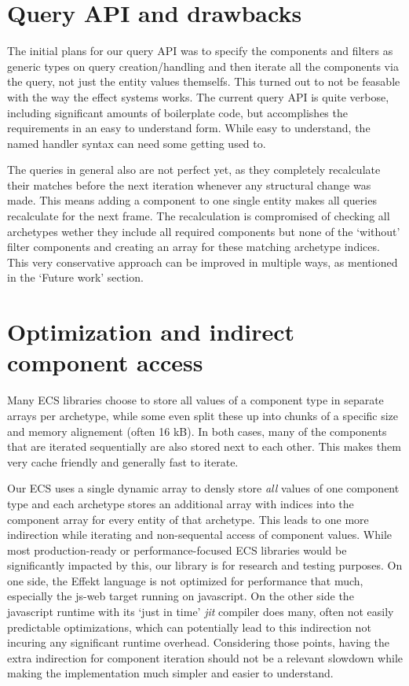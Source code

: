 \section{Query API and drawbacks}

The initial plans for our query API was to specify the components and filters as generic types on query creation/handling and then iterate all the components via the query, not just the entity values themselfs. This turned out to not be feasable with the way the effect systems works. The current query API is quite verbose, including significant amounts of boilerplate code, but accomplishes the requirements in an easy to understand form. While easy to understand, the named handler syntax can need some getting used to.

The queries in general also are not perfect yet, as they completely recalculate their matches before the next iteration whenever any structural change was made. This means adding a component to one single entity makes all queries recalculate for the next frame. The recalculation is compromised of checking all archetypes wether they include all required components but none of the `without' filter components and creating an array for these matching archetype indices. This very conservative approach can be improved in multiple ways, as mentioned in the `Future work' section.

\section{Optimization and indirect component access}

Many ECS libraries choose to store all values of a component type in separate arrays per archetype, while some even split these up into chunks of a specific size and memory alignement (often 16 kB). In both cases, many of the components that are iterated sequentially are also stored next to each other. This makes them very cache friendly and generally fast to iterate.

Our ECS uses a single dynamic array to densly store \textit{all} values of one component type and each archetype stores an additional array with indices into the component array for every entity of that archetype. This leads to one more indirection while iterating and non-sequental access of component values. While most production-ready or performance-focused ECS libraries would be significantly impacted by this, our library is for research and testing purposes. On one side, the Effekt language is not optimized for performance that much, especially the \textsf{js-web} target running on javascript. On the other side the javascript runtime with its `just in time' \textit{jit} compiler does many, often not easily predictable optimizations, which can potentially lead to this indirection not incuring any significant runtime overhead. Considering those points, having the extra indirection for component iteration should not be a relevant slowdown while making the implementation much simpler and easier to understand.


